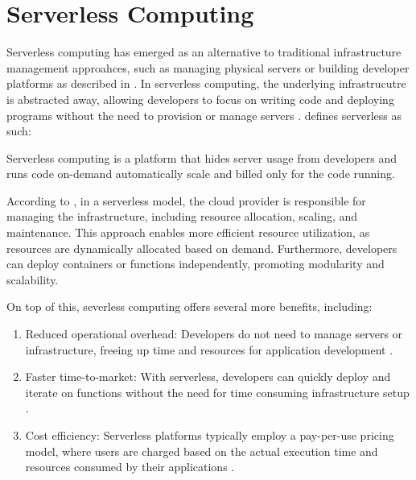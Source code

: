 \documentclass[
  table]{report}
\providecommand{\tightlist}{%
  \setlength{\itemsep}{0pt}\setlength{\parskip}{0pt}}
\begin{document}
\section{Serverless Computing}

Serverless computing has emerged as an alternative to traditional
infrastructure management approahces, such as managing physical servers
or building developer platforms as described in 
\citep{baldiniServerlessComputingCurrent2017}. In serverless computing,
the underlying infrastrucutre is abstracted away, allowing developers to
focus on writing code and deploying programs without the need to
provision or manage servers
\citep{baldiniServerlessComputingCurrent2017,robertsServerlessArchitectures2018}.
\citet{castroRiseServerlessComputing2019} defines serverless as such:

\begin{tcolorbox}[
  definitionstyle,
  title=Serverless definition,
]
Serverless computing is a platform that hides server usage from
developers and runs code on-demand automatically scale and billed only for the
code running. \\

\hfill \citep{castroRiseServerlessComputing2019}

\end{tcolorbox}

According to \citet{baldiniServerlessComputingCurrent2017}, in a
serverless model, the cloud provider is responsible for managing the
infrastructure, including resource allocation, scaling, and maintenance.
This approach enables more efficient resource utilization, as resources
are dynamically allocated based on demand. Furthermore, developers can
deploy containers or functions independently, promoting modularity and
scalability.

On top of this, severless computing offers several more benefits,
including:

\begin{enumerate}
\def\labelenumi{\arabic{enumi}.}
\tightlist
\item
  Reduced operational overhead: Developers do not need to manage servers
  or infrastructure, freeing up time and resources for application
  development \citep{baldiniServerlessComputingCurrent2017}.
\item
  Faster time-to-market: With serverless, developers can quickly deploy
  and iterate on functions without the need for time consuming
  infrastructure setup \citep{adzicServerlessComputingEconomic2017}.
\item
  Cost efficiency: Serverless platforms typically employ a pay-per-use
  pricing model, where users are charged based on the actual execution
  time and resources consumed by their applications
  \citep{eismannReviewServerlessUse2021}.
\end{enumerate}
\end{document}
